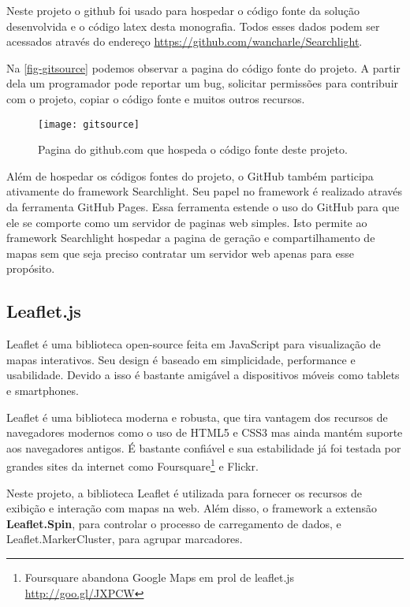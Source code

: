 Neste projeto o github foi usado para hospedar o código fonte da solução desenvolvida e o código latex desta monografia. Todos esses dados podem ser acessados através do endereço \url{https://github.com/wancharle/Searchlight}. 

Na \autoref{fig-gitsource} podemos observar a pagina do código fonte do projeto. A partir dela um programador pode reportar um bug, solicitar permissões para contribuir com o projeto, copiar o código fonte e muitos outros recursos. 

	\begin{figure}[htb]
	\caption{\label{fig-gitsource}Pagina do github.com que hospeda o código fonte deste projeto.}
	\begin{center}
	    \texttt{[image: gitsource]}
	\end{center}
\end{figure}

Além de hospedar os códigos fontes do projeto, o GitHub também participa ativamente do framework Searchlight. Seu papel no framework é realizado através da ferramenta GitHub Pages. Essa ferramenta estende o uso do GitHub para que ele se comporte como um servidor de paginas web simples. Isto permite ao framework Searchlight hospedar a pagina de geração e compartilhamento de mapas sem que seja preciso contratar um servidor web apenas para esse propósito.


\subsection{Leaflet.js}

Leaflet é uma biblioteca open-source feita em JavaScript para visualização de mapas interativos. Seu design é baseado em simplicidade, performance e usabilidade. Devido a isso é bastante amigável a dispositivos móveis como tablets e smartphones.

Leaflet é uma biblioteca moderna e robusta, que tira vantagem dos recursos de navegadores modernos como o uso de HTML5  e CSS3 mas ainda mantém suporte aos navegadores antigos.  É bastante confiável e sua estabilidade já foi testada por grandes sites da internet como Foursquare\footnote{Foursquare abandona Google Maps em prol de leaflet.js \url{http://goo.gl/JXPCW}} e Flickr.

Neste projeto, a biblioteca Leaflet é utilizada para fornecer os recursos de exibição e interação com mapas na web.  Além disso, o framework a extensão  \textbf{Leaflet.Spin}, para controlar o processo de carregamento de dados, e Leaflet.MarkerCluster, para agrupar marcadores.


